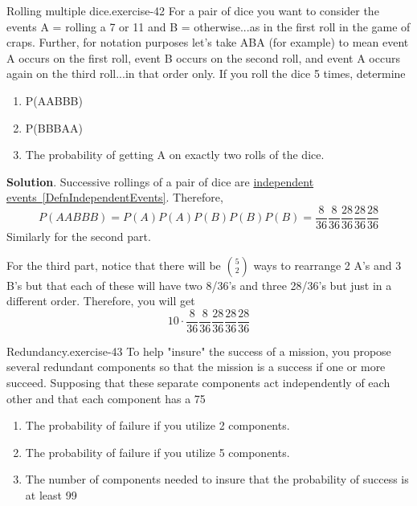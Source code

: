 \documentclass[10pt,]{book}
\numberwithin{equation}{section}
\begin{document}
%
\par
\hypertarget{p-629}{}%
\begin{inlineexercise}{Rolling multiple dice.}{exercise-42}%
\hypertarget{p-630}{}%
For a pair of dice you want to consider the events A = {rolling a 7 or 11} and B = {otherwise}...as in the first roll in the game of craps.  Further, for notation purposes let's take ABA (for example) to mean event A occurs on the first roll, event B occurs on the second roll, and event A occurs again on the third roll...in that order only. If you roll the dice 5 times, determine \leavevmode%
\begin{enumerate}
\item\hypertarget{li-185}{}P(AABBB)%
\item\hypertarget{li-186}{}P(BBBAA)%
\item\hypertarget{li-187}{}The probability of getting A on exactly two rolls of the dice.%
\end{enumerate}
%
\par\smallskip%
\noindent\textbf{Solution}.\hypertarget{solution-20}{}\quad%
\hypertarget{p-631}{}%
Successive rollings of a pair of dice are \hyperref[DefnIndependentEvents]{independent events~\ref{DefnIndependentEvents}}. Therefore,%
\begin{equation*}
P(AABBB) = P(A)P(A)P(B)P(B)P(B) = \frac{8}{36} \frac{8}{36} \frac{28}{36} \frac{28}{36} \frac{28}{36}
\end{equation*}
Similarly for the second part.%
\par
\hypertarget{p-632}{}%
For the third part, notice that there will be \(\binom{5}{2}\) ways to rearrange 2 A's and 3 B's but that each of these will have two 8/36's and three 28/36's but just in a different order. Therefore, you will get%
\begin{equation*}
10 \cdot \frac{8}{36} \frac{8}{36} \frac{28}{36} \frac{28}{36} \frac{28}{36}
\end{equation*}
%
\end{inlineexercise}
%
\par
\hypertarget{p-633}{}%
\begin{inlineexercise}{Redundancy.}{exercise-43}%
\hypertarget{p-634}{}%
To help "insure" the success of a mission, you propose several redundant components so that the mission is a success if one or more succeed. Supposing that these separate components act independently of each other and that each component has a 75%
\begin{enumerate}
\item\hypertarget{li-188}{}The probability of failure if you utilize 2 components.%
\item\hypertarget{li-189}{}The probability of failure if you utilize 5 components.%
\item\hypertarget{li-190}{}The number of components needed to insure that the probability of success is at least 99%
\end{enumerate}
%
\end{inlineexercise}
\end{document}
